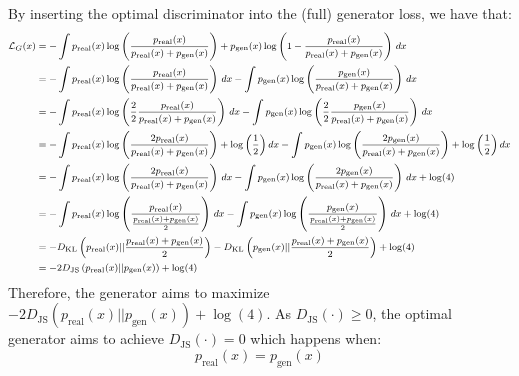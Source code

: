 \begin{description}
        \begin{remark}
            By inserting the optimal discriminator into the (full) generator loss, we have that:
            \[
                \footnotesize
                \begin{split}
                    \mathcal{L}_G(x) &= - \int p_\text{real}(x) \log\left(\frac{p_\text{real}(x)}{p_\text{real}(x) + p_\text{gen}(x)}\right) + p_\text{gen}(x) \log\left(1 - \frac{p_\text{real}(x)}{p_\text{real}(x) + p_\text{gen}(x)}\right) \,dx \\
                    &= - \int p_\text{real}(x) \log\left(\frac{p_\text{real}(x)}{p_\text{real}(x) + p_\text{gen}(x)}\right) \,dx - \int p_\text{gen}(x) \log\left(\frac{p_\text{gen}(x)}{p_\text{real}(x) + p_\text{gen}(x)}\right) \,dx \\
                    &= - \int p_\text{real}(x) \log\left({\frac{2}{2}} \frac{p_\text{real}(x)}{p_\text{real}(x) + p_\text{gen}(x)}\right) \,dx - \int p_\text{gen}(x) \log\left({\frac{2}{2}} \frac{p_\text{gen}(x)}{p_\text{real}(x) + p_\text{gen}(x)}\right) \,dx \\
                    &= - \int p_\text{real}(x) \log\left(\frac{{2} p_\text{real}(x)}{p_\text{real}(x) + p_\text{gen}(x)}\right) + {\log\left(\frac{1}{2}\right)} \,dx - \int p_\text{gen}(x) \log\left(\frac{{2} p_\text{gen}(x)}{p_\text{real}(x) + p_\text{gen}(x)}\right) + {\log\left(\frac{1}{2}\right)} \,dx \\
                    &= - \int p_\text{real}(x) \log\left(\frac{2 p_\text{real}(x)}{p_\text{real}(x) + p_\text{gen}(x)}\right) \,dx - \int p_\text{gen}(x) \log\left(\frac{2 p_\text{gen}(x)}{p_\text{real}(x) + p_\text{gen}(x)}\right) \,dx + \log(4)  \\
                    &= - \int p_\text{real}(x) \log\left(\frac{p_\text{real}(x)}{\frac{p_\text{real}(x) + p_\text{gen}(x)}{2}}\right) \,dx - \int p_\text{gen}(x) \log\left(\frac{p_\text{gen}(x)}{\frac{p_\text{real}(x) + p_\text{gen}(x)}{2}}\right) \,dx + \log(4)  \\
                    &= - D_\text{KL}\left( p_\text{real}(x) || \frac{p_\text{real}(x) + p_\text{gen}(x)}{2} \right) - D_\text{KL}\left( p_\text{gen}(x) || \frac{p_\text{real}(x) + p_\text{gen}(x)}{2} \right) + \log(4) \\
                    &= -2 D_\text{JS}\left( p_\text{real}(x) || p_\text{gen}(x) \right) + \log(4)
                \end{split}
            \]
            Therefore, the generator aims to maximize $-2 D_\text{JS}\left( p_\text{real}(x) || p_\text{gen}(x) \right) + \log(4)$. As $D_\text{JS}(\cdot) \geq 0$, the optimal generator aims to achieve $D_\text{JS}(\cdot) = 0$ which happens when:
            \[ p_\text{real}(x) = p_\text{gen}(x) \]
        \end{remark}


\end{description}
